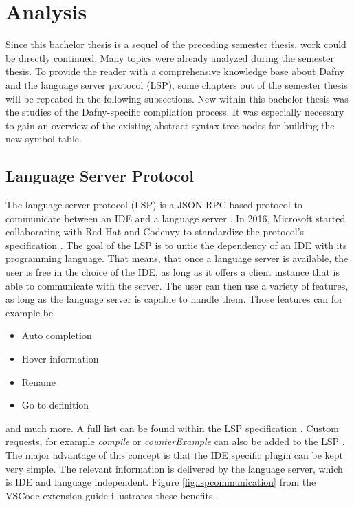 \section{Analysis}

\label{section:analysis}
Since this bachelor thesis is a sequel of the preceding semester thesis, work could be directly continued.
Many topics were already analyzed during the semester thesis.
To provide the reader with a comprehensive knowledge base about Dafny and the language server protocol (LSP), some chapters out of the semester thesis will be repeated in the following subsections.
New within this bachelor thesis was the studies of the Dafny-specific compilation process.
It was especially necessary to gain an overview of the existing abstract syntax tree nodes for building the new symbol table.

\subsection{Language Server Protocol}
\label{section:analysis:lsp}
The language server protocol (LSP) is a JSON-RPC based protocol to communicate between an IDE and a language server \cite{lspWiki}.
In 2016, Microsoft started collaborating with Red Hat and Codenvy to standardize the protocol’s specification \cite{lspWiki}.
The goal of the LSP is to untie the dependency of an IDE with its programming language.
That means, that once a language server is available, the user is free in the choice of the IDE, as long as it offers a client instance that is able to communicate with the server.
The user can then use a variety of features, as long as the language server is capable to handle them.
Those features can for example be
\begin{itemize}
    \item Auto completion
    \item Hover information
    \item Rename
    \item Go to definition
\end{itemize}
and much more. A full list can be found within the LSP specification \cite{lspspec}.
Custom requests, for example \textit{compile} or \textit{counterExample} can also be added to the LSP \cite{lspWiki}.
The major advantage of this concept is that the IDE specific plugin can be kept very simple.
The relevant information is delivered by the language server, which is IDE and language independent.
Figure \ref{fig:lspcommunication} from the VSCode extension guide illustrates these benefits \cite{lspextensionguide}.

